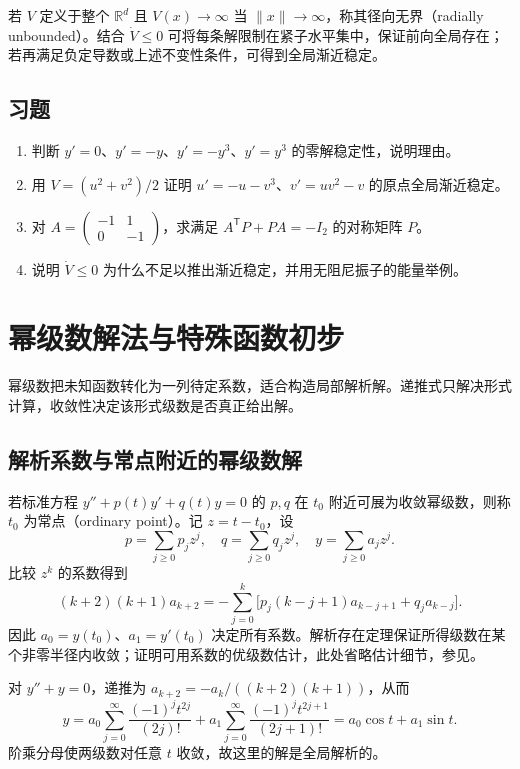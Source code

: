 \documentclass[UTF8,12pt,a4paper,fontset=fandol]{ctexbook}
\begin{document}
若 $V$ 定义于整个 $\mathbb R^d$ 且 $V(x)\to\infty$ 当 $\|x\|\to\infty$，称其径向无界（radially unbounded）。结合 $\dot V\leq0$ 可将每条解限制在紧子水平集中，保证前向全局存在；若再满足负定导数或上述不变性条件，可得到全局渐近稳定。

\section{习题}
\begin{enumerate}
 \item\label{ex:ode-stable} 判断 $y'=0$、$y'=-y$、$y'=-y^3$、$y'=y^3$ 的零解稳定性，说明理由。
 \item\label{ex:ode-lyapunov} 用 $V=(u^2+v^2)/2$ 证明 $u'=-u-v^3$、$v'=u v^2-v$ 的原点全局渐近稳定。
 \item 对 $A=\begin{pmatrix}-1&1\\0&-1\end{pmatrix}$，求满足 $A^{\mathsf T}P+PA=-I_2$ 的对称矩阵 $P$。
 \item 说明 $\dot V\leq0$ 为什么不足以推出渐近稳定，并用无阻尼振子的能量举例。
\end{enumerate}

\chapter{幂级数解法与特殊函数初步}
\label{chap:ode-series}

幂级数把未知函数转化为一列待定系数，适合构造局部解析解。递推式只解决形式计算，收敛性决定该形式级数是否真正给出解。

\section{解析系数与常点附近的幂级数解}
若标准方程 $y''+p(t)y'+q(t)y=0$ 的 $p,q$ 在 $t_0$ 附近可展为收敛幂级数，则称 $t_0$ 为常点（ordinary point）。记 $z=t-t_0$，设
\[
 p=\sum_{j\geq0}p_jz^j,\quad q=\sum_{j\geq0}q_jz^j,\quad y=\sum_{j\geq0}a_jz^j.
\]
比较 $z^k$ 的系数得到
\begin{equation}
 (k+2)(k+1)a_{k+2}
 =-\sum_{j=0}^k\bigl[p_j(k-j+1)a_{k-j+1}+q_ja_{k-j}\bigr].
 \label{eq:ode-power-recursion}
\end{equation}
因此 $a_0=y(t_0)$、$a_1=y'(t_0)$ 决定所有系数。解析存在定理保证所得级数在某个非零半径内收敛；证明可用系数的优级数估计，此处省略估计细节，参见\cite[第4章]{teschl-ode}。

\begin{example}
对 $y''+y=0$，递推为 $a_{k+2}=-a_k/((k+2)(k+1))$，从而
\[
 y=a_0\sum_{j=0}^\infty\frac{(-1)^jt^{2j}}{(2j)!}
 +a_1\sum_{j=0}^\infty\frac{(-1)^jt^{2j+1}}{(2j+1)!}
 =a_0\cos t+a_1\sin t.
\]
阶乘分母使两级数对任意 $t$ 收敛，故这里的解是全局解析的。
\end{example}
\end{document}
